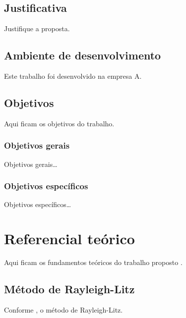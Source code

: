 \documentclass[12pt,oneside,english,brazil,lmodern]{ucsmonograph}
\begin{document}
	\section{Justificativa}
	Justifique a proposta.
	
	\section{Ambiente de desenvolvimento}
	Este trabalho foi desenvolvido na empresa A.
	
	\section{Objetivos}
	Aqui ficam os objetivos do trabalho.
	
	\subsection{Objetivos gerais}
	Objetivos gerais\dots
	
	\subsection{Objetivos específicos}
	Objetivos específicos\dots
	
	\chapter{Referencial teórico}
	Aqui ficam os fundamentos teóricos do trabalho proposto \cite{rao:2008}.
	
	\section{Método de Rayleigh-Litz}
	Conforme , o método de Rayleigh-Litz.
	
\end{document}
